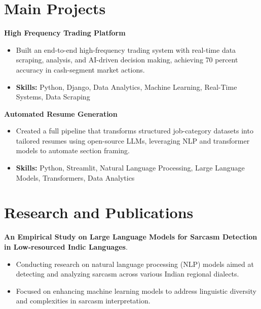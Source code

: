 \documentclass[a4paper,11pt]{article}
\begin{document}
\section{\textbf{Main Projects}}

\vspace{1mm}
  \textbf{High Frequency Trading Platform  }
\vspace{-1.5mm} %
\begin{itemize}
  \item Built an end-to-end high-frequency trading system with real-time data scraping, analysis, and AI-driven decision making, achieving 70 percent accuracy in cash-segment market actions.
\vspace{-3mm}
  \item \textbf{Skills:} Python, Django, Data Analytics, Machine Learning, Real-Time Systems, Data Scraping
\end{itemize}


\vspace{1mm}
   \textbf{Automated Resume Generation }
\vspace{-1.5mm} %
\begin{itemize}
  \item Created a full pipeline that transforms structured job-category datasets into tailored resumes using open-source LLMs, leveraging NLP and transformer models to automate section framing.
\vspace{-3mm}
  \item \textbf{Skills:} Python, Streamlit, Natural Language Processing, Large Language Models, Transformers, Data Analytics
\end{itemize}



\section{\textbf{Research and Publications} \hfill }
\vspace{1mm}
  \textbf{An Empirical Study on Large Language Models for Sarcasm Detection in Low-resourced Indic Languages}.
\vspace{-1mm} %
\begin{itemize}
  \item Conducting research on natural language processing (NLP) models aimed at detecting and analyzing sarcasm across various Indian regional dialects.
\vspace{-3mm}
  \item Focused on enhancing machine learning models to address linguistic diversity and complexities in sarcasm interpretation.
\end{itemize}
\end{document}
